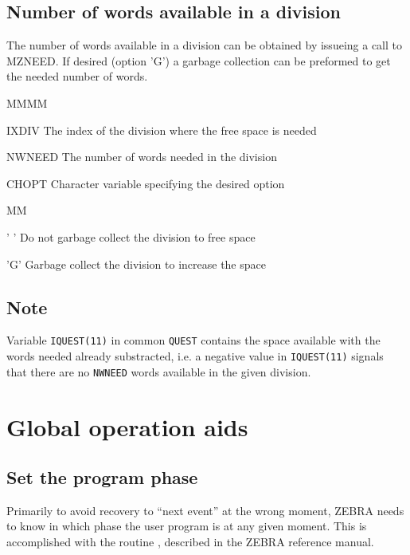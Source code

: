 \subsection{Number of words available in a division}
\par The number of words available in a division can be obtained
by issueing a call to MZNEED.
If desired (option 'G') a garbage collection can be preformed to
get the needed number of words.
\Idesc
\begin{DL}{MMMM}
\item[IXDIV]The index of the division where the free space is needed
\item[NWNEED]The number of words needed in the division
\item[CHOPT]Character variable specifying the desired option
\begin{DL}{MM}
\item[' ']Do not garbage collect the division to free space
\item['G']Garbage collect the division to increase the space
\end{DL}
\end{DL}
\subsection{Note}
\par Variable {\tt IQUEST(11)} in common {\tt QUEST} contains the space
available with the words needed already substracted,
i.e. a negative value in {\tt IQUEST(11)} signals that there are
no {\tt NWNEED} words available in the given division.
\section{Global operation aids}
\subsection{Set the program phase}
\par Primarily to avoid recovery to ``next event'' at the wrong moment,
ZEBRA needs to know in which phase the user program is at any
given moment. This is accomplished with the routine ,
described in the ZEBRA reference manual.
\label{SR_ZPHASE}%

